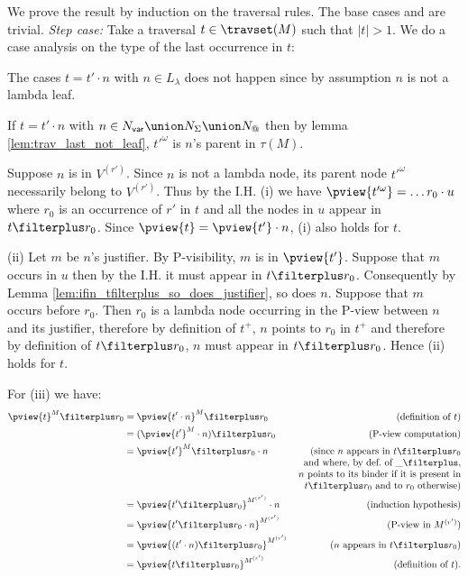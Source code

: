 We prove the result by induction on the traversal rules. The base cases  and
 are trivial. \emph{Step case:} Take a traversal $t
\in \travset(M)$ such that $|t|>1$. We do a case analysis on the type of the last occurrence in $t$:
    \begin{compactitem}
    \item The cases $t = t' \cdot n$ with $n\in L_\lambda$ does not happen since by assumption $n$ is not a
    lambda leaf.

    \item If $t = t' \cdot n$ with $n \in N_{\sf var} \union
    N_\Sigma \union N_@$ then by lemma
    \ref{lem:trav_last_not_leaf}, $t'^\omega$ is $n$'s
    parent in $\tau(M)$.

    Suppose $n$ is in $V^{(r')}$. Since $n$ is not a lambda
    node, its parent node $t'^\omega$ necessarily belong to
    $V^{(r')}$. Thus by the I.H. (i) we have
    $\pview{t'^\omega} = \ldots r_0 \cdot u$ where $r_0$ is
    an occurrence of $r'$ in $t$ and all the nodes in
    $u$ appear in $t\filterplus r_0$.
    Since $\pview{t} = \pview{t'} \cdot n$, (i) also holds for $t$.

    (ii) Let $m$ be $n$'s justifier. By P-visibility, $m$ is in $\pview{t'}$.
    Suppose that $m$ occurs in $u$ then by the I.H. it must appear in $t\filterplus r_0$. Consequently by Lemma \ref{lem:ifin_tfilterplus_so_does_justifier}, so does $n$.
    Suppose that $m$ occurs before $r_0$. Then $r_0$ is a lambda node occurring in the P-view between $n$ and its justifier, therefore
    by definition of $t^+$, $n$ points to $r_0$ in $t^+$ and therefore by definition of $t\filterplus  r_0$,
    $n$ must appear in $t\filterplus r_0$. Hence (ii) holds for $t$.

    For (iii) we have:
        \begin{align*}
        \pview{t}^M \filterplus r_0
    &= \pview{t' \cdot n}^M \filterplus r_0 & (\mbox{definition of } t)\\
            &= (\pview{t'}^M \cdot n) \filterplus r_0  & (\mbox{P-view computation}) \\
            &= \pview{t'}^M \filterplus r_0  \cdot n             & \parbox[t]{6cm}{(\raggedleft since $n$ appears in $t\filterplus r_0$ and where,
             by def.\ of $\_ \filterplus$,  $n$ points to its binder if it is present in $t\filterplus r_0$ and to
             $r_0$ otherwise)} \\
            &= \pview{t' \filterplus  r_0 }^{M^{(r')}} \cdot n            & (\mbox{induction hypothesis}) \\
            &= \pview{t' \filterplus  r_0 \cdot n }^{M^{(r')}} & (\mbox{P-view in $M^{(r')}$}) \\
            &= \pview{(t' \cdot n ) \filterplus  r_0  }^{M^{(r')}}           & (\mbox{$n$ appears in $t\filterplus r_0$}) \\
            &= \pview{t \filterplus  r_0  }^{M^{(r')}}
     & (\mbox{definition of } t).
        \end{align*}


\end{compactitem}
